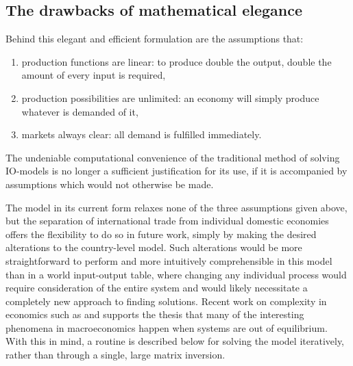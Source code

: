 \documentclass[a4paper]{article}
\begin{document}
\subsection{The drawbacks of mathematical elegance}
Behind this elegant and efficient formulation are the assumptions that:
\begin{enumerate}[i]
\itemsep 0em
\item production functions are linear: to produce double the output, double the amount of every input is required,
\item production possibilities are unlimited: an economy will simply produce whatever is demanded of it,
\item markets always clear: all demand is fulfilled immediately.
\end{enumerate}
The undeniable computational convenience of the traditional method of solving IO-models is no longer a sufficient justification for its use, if it is accompanied by assumptions which would not otherwise be made.

The model in its current form relaxes none of the three assumptions given above, but the separation of international trade from individual domestic economies offers the flexibility to do so in future work, simply by making the desired alterations to the country-level model.
Such alterations would be more straightforward to perform and more intuitively comprehensible in this model than in a world input-output table, where changing any individual process would require consideration of the entire system and would likely necessitate a completely new approach to finding solutions.
Recent work on complexity in economics such as \textcite{beinhocker_origin_2006} and \textcite{ramalingam_exploring_2009} supports the thesis that many of the interesting phenomena in macroeconomics happen when systems are out of equilibrium.
With this in mind, a routine is described below for solving the model iteratively, rather than through a single, large matrix inversion.
\end{document}

